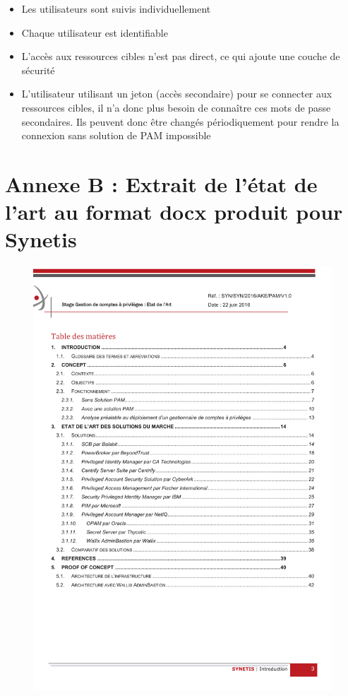 \begin{itemize}
	\item Les utilisateurs sont suivis individuellement
	\item Chaque utilisateur est identifiable
	\item L'accès aux ressources cibles n'est pas direct, ce qui ajoute une couche de sécurité
	\item L'utilisateur utilisant un jeton (accès secondaire) pour se connecter aux ressources cibles, il n'a donc plus besoin de connaître ces mots de passe secondaires. Ils peuvent donc être changés périodiquement pour rendre la connexion sans solution de PAM impossible
\end{itemize}



\pagebreak


\section*{Annexe B : Extrait de l'état de l'art au format docx produit pour Synetis}
\label{annexe:B}

\begin{figure}[!ht]
    \center
    \includegraphics[width=\textwidth]{./images/extraitEDA.pdf}
    \label{fig:diagseq_PAM}
\end{figure}